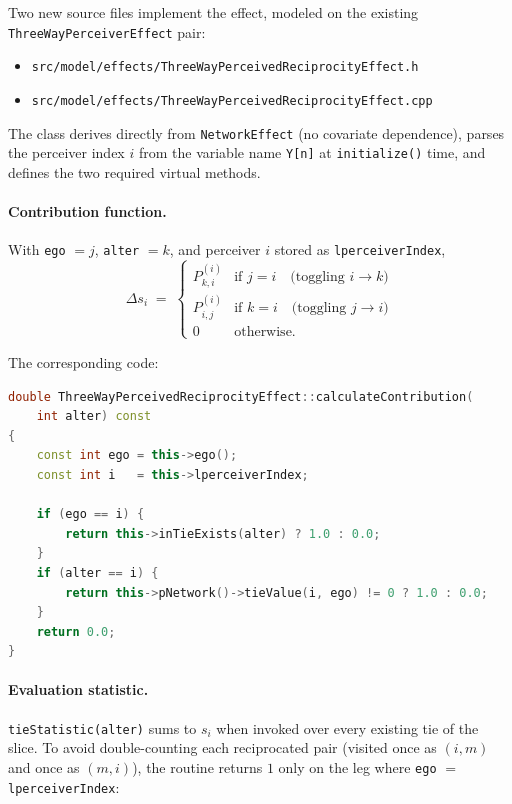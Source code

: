 \documentclass[11pt]{article}
\newcommand{\file}[1]{\texttt{#1}}
\begin{document}
Two new source files implement the effect, modeled on the existing
\file{ThreeWayPerceiverEffect} pair:

\begin{itemize}[leftmargin=*]
  \item \file{src/model/effects/ThreeWayPerceivedReciprocityEffect.h}
  \item \file{src/model/effects/ThreeWayPerceivedReciprocityEffect.cpp}
\end{itemize}

The class derives directly from \texttt{NetworkEffect} (no covariate
dependence), parses the perceiver index $i$ from the variable name
\texttt{Y[n]} at \texttt{initialize()} time, and defines the two
required virtual methods.

\paragraph{Contribution function.}
With \texttt{ego} $= j$, \texttt{alter} $= k$, and perceiver $i$ stored
as \texttt{lperceiverIndex},
\[
\Delta s_i \;=\;
\begin{cases}
P^{(i)}_{k,i} & \text{if } j = i \quad \text{(toggling } i\!\to\!k\text{)}\\[2pt]
P^{(i)}_{i,j} & \text{if } k = i \quad \text{(toggling } j\!\to\!i\text{)}\\[2pt]
0 & \text{otherwise.}
\end{cases}
\]

The corresponding code:

\begin{lstlisting}[language=C++]
double ThreeWayPerceivedReciprocityEffect::calculateContribution(
    int alter) const
{
    const int ego = this->ego();
    const int i   = this->lperceiverIndex;

    if (ego == i) {
        return this->inTieExists(alter) ? 1.0 : 0.0;
    }
    if (alter == i) {
        return this->pNetwork()->tieValue(i, ego) != 0 ? 1.0 : 0.0;
    }
    return 0.0;
}
\end{lstlisting}

\paragraph{Evaluation statistic.}
\texttt{tieStatistic(alter)} sums to $s_i$ when invoked over every
existing tie of the slice.  To avoid double-counting each reciprocated
pair (visited once as $(i,m)$ and once as $(m,i)$), the routine returns
$1$ only on the leg where \texttt{ego} $=$ \texttt{lperceiverIndex}:
\end{document}
